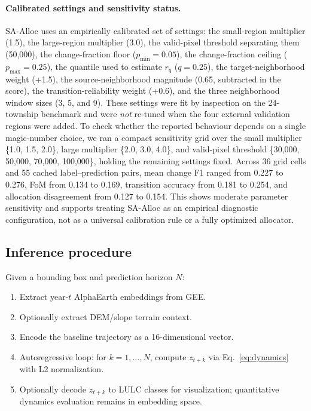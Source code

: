 \documentclass{article}
\begin{document}
\paragraph{Calibrated settings and sensitivity status.} SA-Alloc uses an empirically calibrated set of settings: the small-region multiplier (1.5), the large-region multiplier (3.0), the valid-pixel threshold separating them (50{,}000), the change-fraction floor ($p_{\min}=0.05$), the change-fraction ceiling ($p_{\max}=0.25$), the quantile used to estimate $r_q$ ($q=0.25$), the target-neighborhood weight (+1.5), the source-neighborhood magnitude (0.65, subtracted in the score), the transition-reliability weight (+0.6), and the three neighborhood window sizes (3, 5, and 9). These settings were fit by inspection on the 24-township benchmark and were \emph{not} re-tuned when the four external validation regions were added. To check whether the reported behaviour depends on a single magic-number choice, we ran a compact sensitivity grid over the small multiplier \{1.0, 1.5, 2.0\}, large multiplier \{2.0, 3.0, 4.0\}, and valid-pixel threshold \{30{,}000, 50{,}000, 70{,}000, 100{,}000\}, holding the remaining settings fixed. Across 36 grid cells and 55 cached label--prediction pairs, mean change F1 ranged from 0.227 to 0.276, FoM from 0.134 to 0.169, transition accuracy from 0.181 to 0.254, and allocation disagreement from 0.127 to 0.154. This shows moderate parameter sensitivity and supports treating SA-Alloc as an empirical diagnostic configuration, not as a universal calibration rule or a fully optimized allocator.

\subsection{Inference procedure}

Given a bounding box and prediction horizon $N$:
\begin{enumerate}
\item Extract year-$t$ AlphaEarth embeddings from GEE.
\item Optionally extract DEM/slope terrain context.
\item Encode the baseline trajectory as a 16-dimensional vector.
\item Autoregressive loop: for $k = 1, \ldots, N$, compute $z_{t+k}$ via Eq.~\ref{eq:dynamics} with L2 normalization.
\item Optionally decode $z_{t+k}$ to LULC classes for visualization; quantitative dynamics evaluation remains in embedding space.
\end{enumerate}
\end{document}
